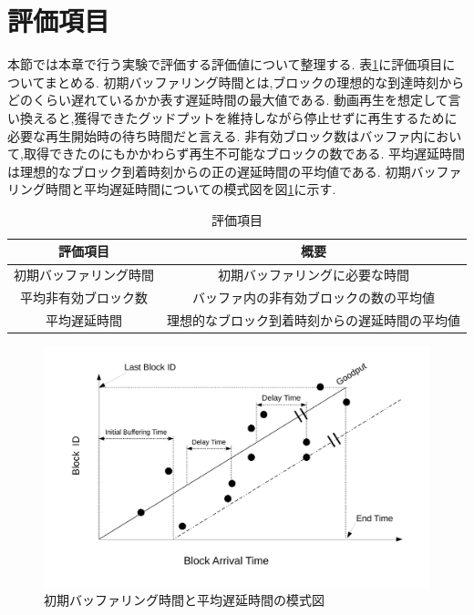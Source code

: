 \documentclass[a4j,12pt]{gradthesis_utf8}
\begin{document}
\section{評価項目}
\label{hyoukakoumoku}
本節では本章で行う実験で評価する評価値について整理する.
表\ref{hyoka}に評価項目についてまとめる.
初期バッファリング時間とは,ブロックの理想的な到達時刻からどのくらい遅れているかか表す遅延時間の最大値である.
動画再生を想定して言い換えると,獲得できたグッドプットを維持しながら停止せずに再生するために必要な再生開始時の待ち時間だと言える.
非有効ブロック数はバッファ内において,取得できたのにもかかわらず再生不可能なブロックの数である.
平均遅延時間は理想的なブロック到着時刻からの正の遅延時間の平均値である.
初期バッファリング時間と平均遅延時間についての模式図を図\ref{buf}に示す.

\newpage

\begin{table}[htb]
	\begin{center}
		\caption{評価項目}
		\label{hyoka}
		\begin{tabular}{|c|c|} \hline
			評価項目 & 概要　\\ \hline \hline
			初期バッファリング時間 & 初期バッファリングに必要な時間 \\ \hline
			平均非有効ブロック数 & バッファ内の非有効ブロックの数の平均値 \\ \hline
			平均遅延時間 & 理想的なブロック到着時刻からの遅延時間の平均値 \\ \hline
		\end{tabular}
	\end{center}
\end{table}

\begin{figure}[ht]
	\label{buf}
	\begin{center}
		\includegraphics[width=17cm]{figure/initialBuffering.pdf}
		\caption{初期バッファリング時間と平均遅延時間の模式図}
	\end{center}
\end{figure}
\end{document}
